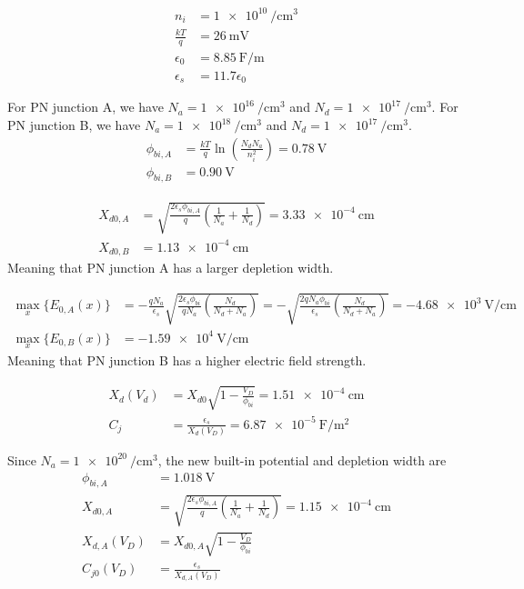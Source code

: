 \documentclass{article}
\begin{document}
\question{}

\begin{align}
  n_{i} &= \qty{1e10}{\per\centi\meter\cubed} \\
  \frac{kT}{q} &= \qty{26}{\milli\volt} \\
  \epsilon_{0} &= \qty{8.85}{\farad\per\meter} \\
  \epsilon_{s} &= 11.7 \epsilon_{0}
\end{align}

\begin{subparts}
  \item For PN junction A, we have \(N_{a} = \qty{1e16}{\per\centi\meter\cubed}\) and \(N_{d} = \qty{1e17}{\per\centi\meter\cubed}\).
  For PN junction B, we have \(N_{a} = \qty{1e18}{\per\centi\meter\cubed}\) and \(N_{d} = \qty{1e17}{\per\centi\meter\cubed}\).
  \begin{align}
    \phi_{bi, A} &= \frac{kT}{q} \ln\left(\frac{N_{d} N_{a}}{n_{i}^{2}}\right) = \qty{0.78}{\volt} \\
    \phi_{bi, B} &= \qty{0.90}{\volt}
  \end{align}
  \item
  \begin{align}
    X_{d0, A} &= \sqrt{\frac{2 \epsilon_{s} \phi_{bi, A}}{q} \left(\frac{1}{N_{a}} + \frac{1}{N_{d}}\right)} = \qty{3.33e-4}{\centi\meter} \\
    X_{d0, B} &= \qty{1.13e-4}{\centi\meter}
  \end{align}
  Meaning that PN junction A has a larger depletion width.
  \item
  \begin{align}
    \max_{x}\{E_{0, A}(x)\} &= -\frac{q N_{a}}{\epsilon_{s}} \sqrt{\frac{2 \epsilon_{s} \phi_{bi}}{q N_{a}} \left(\frac{N_{d}}{N_{d} + N_{a}}\right)} = - \sqrt{\frac{2 q N_{a} \phi_{bi}}{\epsilon_{s}} \left(\frac{N_{d}}{N_{d} + N_{a}}\right)} = \qty{-4.68e3}{\volt\per\centi\meter} \\
    \max_{x}\{E_{0, B}(x)\} &= \qty{-1.59e4}{\volt\per\centi\meter}
  \end{align}
  Meaning that PN junction B has a higher electric field strength.
  \item
  \begin{align}
    X_{d}(V_{d}) &= X_{d0} \sqrt{1 - \frac{V_{D}}{\phi_{bi}}} = \qty{1.51e-4}{\centi\meter} \\
    C_{j} &= \frac{\epsilon_{s}}{X_{d}(V_{D})} = \qty{6.87e-5}{\farad\per\meter\squared}
  \end{align}
  \item Since \(N_{a} = \qty{1e20}{\per\centi\meter\cubed}\), the new built-in potential and depletion width are
  \begin{align}
    \phi_{bi, A} &= \qty{1.018}{\volt} \\
    X_{d0, A} &= \sqrt{\frac{2 \epsilon_{s} \phi_{bi, A}}{q} \left(\frac{1}{N_{a}} + \frac{1}{N_{d}}\right)} = \qty{1.15e-4}{\centi\meter} \\
    X_{d, A}(V_{D}) &= X_{d0, A} \sqrt{1 - \frac{V_{D}}{\phi_{bi}}} \\
    C_{j0}(V_{D}) &= \frac{\epsilon_{s}}{X_{d, A}(V_{D})}
  \end{align}
\end{subparts}
\end{document}
